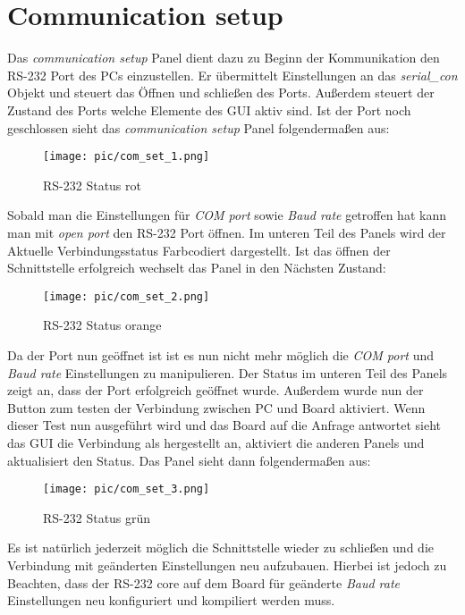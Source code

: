 \documentclass[%
  paper=A4, %
  pagesize, %
  12pt,
  ngerman   %
]{scrreprt}  %
\begin{document}
\section{Communication setup}
Das \emph{communication setup} Panel dient dazu zu Beginn der Kommunikation den RS-232 Port des PCs einzustellen. Er übermittelt Einstellungen an das \emph{serial\_con} Objekt und steuert das Öffnen und schließen des Ports. Außerdem steuert der Zustand des Ports welche Elemente des GUI aktiv sind. Ist der Port noch geschlossen sieht das \emph{communication setup} Panel folgendermaßen aus:

\begin{figure}[ht]
	\centering
  \texttt{[image: pic/com\_set\_1.png]}
	\caption{RS-232 Status rot}
	\label{ser_red}
\end{figure}

Sobald man die Einstellungen für \emph{COM port} sowie \emph{Baud rate} getroffen hat kann man mit \emph{open port} den RS-232 Port öffnen. Im unteren Teil des Panels wird der Aktuelle Verbindungsstatus Farbcodiert dargestellt. Ist das öffnen der Schnittstelle erfolgreich wechselt das Panel in den Nächsten Zustand:

\begin{figure}[ht]
	\centering
  \texttt{[image: pic/com\_set\_2.png]}
	\caption{RS-232 Status orange}
	\label{ser_orange}
\end{figure}

Da der Port nun geöffnet ist ist es nun nicht mehr möglich die \emph{COM port} und \emph{Baud rate} Einstellungen zu manipulieren. Der Status im unteren Teil des Panels zeigt an, dass der Port erfolgreich geöffnet wurde. Außerdem wurde nun der Button zum testen der Verbindung zwischen PC und Board aktiviert. Wenn dieser Test nun ausgeführt wird und das Board auf die Anfrage antwortet sieht das GUI die Verbindung als hergestellt an, aktiviert die anderen Panels und aktualisiert den Status. Das Panel sieht dann folgendermaßen aus:

\begin{figure}[ht]
	\centering
  \texttt{[image: pic/com\_set\_3.png]}
	\caption{RS-232 Status grün}
	\label{ser_green}
\end{figure}



Es ist natürlich jederzeit möglich die Schnittstelle wieder zu schließen und die Verbindung mit geänderten Einstellungen neu aufzubauen. Hierbei ist jedoch zu Beachten, dass der RS-232 core auf dem Board für geänderte \emph{Baud rate} Einstellungen neu konfiguriert und kompiliert werden muss.
\end{document}
